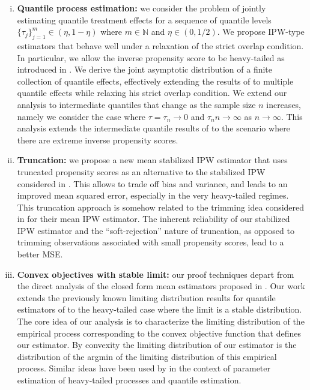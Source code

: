 \documentclass[12pt]{amsart}
\newcommand{\1}{\mathbbm{1}}
\newcommand{\0}{\mathbf{0}}
\theoremstyle{plain}
\theoremstyle{definition}
\begin{document}
\begin{enumerate}[(i)]
    \item
    \textbf{Quantile process estimation:} we consider the problem of jointly estimating  quantile treatment effects for a sequence of quantile levels $\{\tau_j\}_{j=1}^m\in(\eta,1-\eta)$ where  $m\in\mathbb{N}$ and  $\eta\in (0,1/2)$. We propose IPW-type estimators that behave well under a relaxation of  the strict overlap condition. In particular, we allow  the inverse propensity score to be heavy-tailed as  introduced in \cite{ma:wang2020,heiler:kazak2021}. We derive the joint asymptotic distribution of a finite collection of quantile effects, effectively extending the results of \cite{firpo2007} to multiple quantile effects while relaxing his strict overlap condition. We extend our analysis to intermediate  quantiles that change as the sample size $n$ increases, namely we consider the case where   $\tau=\tau_n\to 0$ and $\tau_nn\to\infty$ as $n\to \infty$. This analysis extends the intermediate quantile results of \cite{zhang2018}  to the scenario where there are extreme inverse propensity scores. 
    \item 
    
    \textbf{Truncation:} we propose a new mean stabilized IPW estimator that uses truncated propensity scores as an alternative to the stabilized IPW considered in \cite{heiler:kazak2021}. This allows to trade off bias and variance, and leads to an improved mean squared error, especially in the very heavy-tailed regimes. This truncation approach is somehow related to the trimming idea considered in \cite{ma:wang2020}  for their mean IPW estimator. The inherent reliability of our stabilized IPW estimator and the ``soft-rejection'' nature of truncation, as opposed to trimming observations associated with small propensity scores, lead to a better MSE. 
    
    \item 
    \textbf{Convex objectives with stable limit:} our proof techniques depart from the direct analysis of the  closed form mean estimators proposed in \cite{ma:wang2020,heiler:kazak2021}. Our work extends the previously known limiting distribution results for quantile estimators  of \cite{firpo2007,zhang2018} to the heavy-tailed case where the limit is a stable distribution. The core idea of our analysis is to characterize the limiting distribution of the empirical process corresponding to the convex objective function that defines our estimator.  By convexity the limiting distribution of our estimator is the distribution of the argmin of the limiting distribution of this empirical process. Similar ideas have been used by \cite{davis1992m, knight2002limiting, goh2009nonstandard} in the context of parameter estimation of heavy-tailed processes and quantile estimation. 


\end{enumerate}
\end{document}
